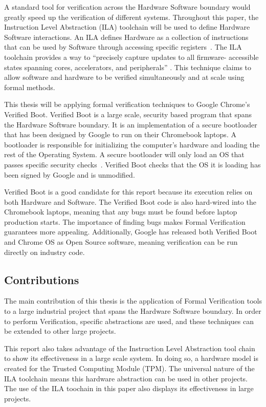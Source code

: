 A standard tool for verification across the Hardware Software boundary would
greatly speed up the verification of different systems.
Throughout this paper, the  Instruction Level Abstraction (ILA) toolchain will be used to define Hardware Software interactions.
An ILA defines Hardware as a collection of instructions that can be used by
Software through accessing specific registers~\cite{ila}.
The ILA toolchain provides a way to ``precisely capture updates to all firmware-
accessible states spanning cores, accelerators, and peripherals''
\cite{ila-template}.
This technique claims to allow software and hardware to be verified simultaneously and at scale using formal methods.

This thesis will be applying formal verification techniques to Google Chrome's
Verified Boot.
Verified Boot is a large scale, security based program that spans the Hardware
Software boundary. 
It is an implementation of a secure bootloader that has been designed by Google to run on their Chromebook laptops\cite{voot}.
A bootloader is responsible for initializing the computer's hardware and
loading the rest of the Operating System.
A secure bootloader will only load an OS that passes specific
security checks~\cite{secure-bootloader}.
Verified Boot checks that the OS it is loading has been signed by Google and is
unmodified.

Verified Boot is a good candidate for this report because its execution relies
on both Hardware and Software.
The Verified Boot code is also hard-wired into the Chromebook laptops, meaning
that any bugs must be found before laptop production starts.
The importance of finding bugs makes Formal Verification guarantees more appealing.
Additionally, Google has released both Verified Boot and Chrome OS as Open
Source software, meaning verification can be run directly on industry code.

\subsection{Contributions}

The main contribution of this thesis is the application of Formal Verification
tools to a large industrial project that spans the Hardware Software boundary.
In order to perform Verification, specific abstractions are used, and these
techniques can be extended to other large projects.

This report also takes advantage of the Instruction Level Abstraction tool chain
to show its effectiveness in a large scale system.
In doing so, a hardware model is created for the Trusted Computing
Module (TPM).
The universal nature of the ILA toolchain means this hardware abstraction can be used in other projects.
The use of the ILA toochain in this paper also displays its effectiveness in large projects.

